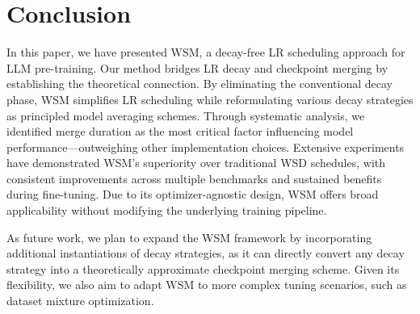
\section{Conclusion}
In this paper, we have presented WSM, a decay-free LR scheduling approach for LLM pre-training. Our method bridges LR decay and checkpoint merging by establishing the theoretical connection. By eliminating the conventional decay phase, WSM simplifies LR scheduling while reformulating various decay strategies as principled model averaging schemes. Through systematic analysis, we identified merge duration as the most critical factor influencing model performance—outweighing other implementation choices. Extensive experiments have demonstrated WSM’s superiority over traditional WSD schedules, with consistent improvements across multiple benchmarks and sustained benefits during fine-tuning. Due to its optimizer-agnostic design, WSM offers broad applicability without modifying the underlying training pipeline. 

As future work, we plan to expand the WSM framework by incorporating additional instantiations of decay strategies, as it can directly convert any decay strategy into a theoretically approximate checkpoint merging scheme. Given its flexibility, we also aim to adapt WSM to more complex tuning scenarios, such as dataset mixture optimization.






